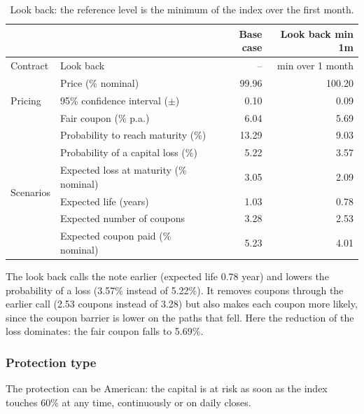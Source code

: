 \documentclass[11pt,a4paper]{article}
\begin{document}
\begin{table}[htbp]
  \centering
  \small
  \begin{tabular}{llrr}
    \toprule
     & & \textbf{Base case} & \textbf{Look back min 1m} \\
    \midrule
    \multirow{1}{*}{Contract}
      & Look back & -- & min over 1 month \\
    \midrule
    \multirow{3}{*}{Pricing}
      & Price (\% nominal) & 99.96 & 100.20 \\
      & 95\% confidence interval ($\pm$) & 0.10 & 0.09 \\
      & Fair coupon (\% p.a.) & 6.04 & 5.69 \\
    \midrule
    \multirow{6}{*}{Scenarios}
      & Probability to reach maturity (\%) & 13.29 & 9.03 \\
      & Probability of a capital loss (\%) & 5.22 & 3.57 \\
      & Expected loss at maturity (\% nominal) & 3.05 & 2.09 \\
      & Expected life (years) & 1.03 & 0.78 \\
      & Expected number of coupons & 3.28 & 2.53 \\
      & Expected coupon paid (\% nominal) & 5.23 & 4.01 \\
    \bottomrule
  \end{tabular}
  \caption{Look back: the reference level is the minimum of the index over the first month.}
  \label{tab:phoenix-lookback}
\end{table}

The look back calls the note earlier (expected life 0.78 year) and lowers the probability of a loss (3.57\% instead
of 5.22\%). It removes coupons through the earlier call (2.53 coupons instead of 3.28) but also makes each coupon more
likely, since the coupon barrier is lower on the paths that fell. Here the reduction of the loss dominates: the fair
coupon falls to 5.69\%.

\clearpage
\subsubsection{Protection type}

The protection can be American: the capital is at risk as soon as the index touches 60\% at any time, continuously or
on daily closes.
\end{document}
